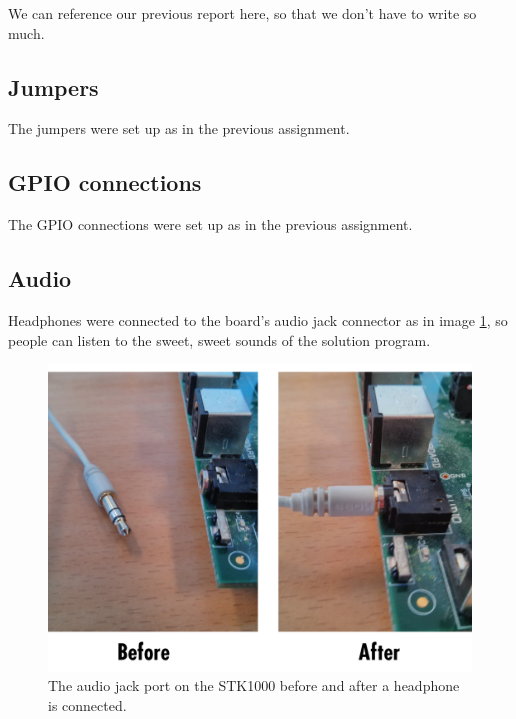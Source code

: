 We can reference our previous report here, so that we don't have to write so much.

\subsection{Jumpers}

The jumpers were set up as in the previous assignment.\cite{tdt4258-1}

\subsection{GPIO connections}

The GPIO connections were set up as in the previous assignment.\cite{tdt4258-1}

\subsection{Audio}

Headphones were connected to the board's audio jack connector as in image \ref{img-audiojack}, so people can listen to the sweet, sweet sounds of the solution program.

\begin{figure}
\includegraphics[width = \textwidth]{images/audiojack.png}
\caption{The audio jack port on the STK1000 before and after a headphone is connected.}
\label{img-audiojack}
\end{figure}
